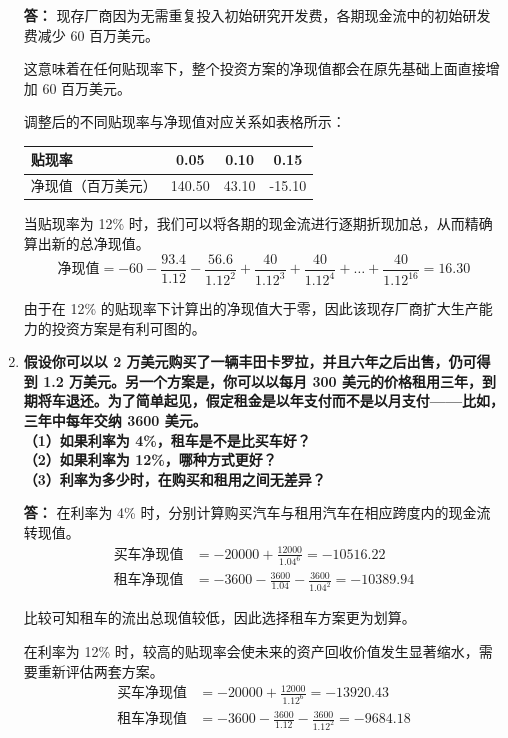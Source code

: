 \begin{enumerate}[label=\textbf{\arabic*.}, leftmargin=*]
		\textbf{答：}
		现存厂商因为无需重复投入初始研究开发费，各期现金流中的初始研发费减少 60 百万美元。
		
		这意味着在任何贴现率下，整个投资方案的净现值都会在原先基础上面直接增加 60 百万美元。
		
		调整后的不同贴现率与净现值对应关系如表格所示：
		\begin{center}
			\small
			\setlength{\tabcolsep}{8pt}
			\renewcommand{\arraystretch}{1.2}
			\begin{tabular}{lccc}
				\hline
				贴现率 & 0.05 & 0.10 & 0.15 \\ \hline
				净现值（百万美元） & 140.50 & 43.10 & -15.10 \\ \hline
			\end{tabular}
		\end{center}
		
		当贴现率为 12\% 时，我们可以将各期的现金流进行逐期折现加总，从而精确算出新的总净现值。
		\[
		\text{净现值} = -60 - \frac{93.4}{1.12} - \frac{56.6}{1.12^2} + \frac{40}{1.12^3} + \frac{40}{1.12^4} + \dots + \frac{40}{1.12^{16}} = 16.30
		\]
		
		由于在 12\% 的贴现率下计算出的净现值大于零，因此该现存厂商扩大生产能力的投资方案是有利可图的。
		
		\item \textbf{假设你可以以 2 万美元购买了一辆丰田卡罗拉，并且六年之后出售，仍可得到 1.2 万美元。另一个方案是，你可以以每月 300 美元的价格租用三年，到期将车退还。为了简单起见，假定租金是以年支付而不是以月支付——比如，三年中每年交纳 3600 美元。\\（1）如果利率为 4\%，租车是不是比买车好？\\（2）如果利率为 12\%，哪种方式更好？\\（3）利率为多少时，在购买和租用之间无差异？}
		
		\textbf{答：}
		在利率为 4\% 时，分别计算购买汽车与租用汽车在相应跨度内的现金流转现值。
		\[
		\begin{aligned}
			\text{买车净现值} &= -20000 + \frac{12000}{1.04^6} = -10516.22 \\
			\text{租车净现值} &= -3600 - \frac{3600}{1.04} - \frac{3600}{1.04^2} = -10389.94
		\end{aligned}
		\]
		
		比较可知租车的流出总现值较低，因此选择租车方案更为划算。
		
		在利率为 12\% 时，较高的贴现率会使未来的资产回收价值发生显著缩水，需要重新评估两套方案。
		\[
		\begin{aligned}
			\text{买车净现值} &= -20000 + \frac{12000}{1.12^6} = -13920.43 \\
			\text{租车净现值} &= -3600 - \frac{3600}{1.12} - \frac{3600}{1.12^2} = -9684.18
		\end{aligned}
		\]
		

\end{enumerate}
